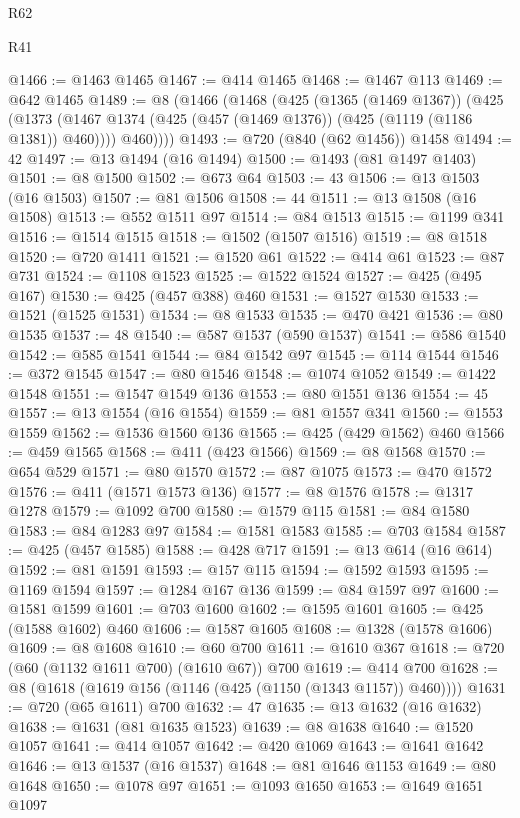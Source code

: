\begin{lexlean}{R62}
\begin{lexlean}{R41}
\begin{coremodule}
{{{{{{{{{{{{{{{{{{{{{{{{{{{{{{{{{{{{{{{{{{{{{{{{{{{{{{{{{{{{{{{{{{{{{{{{{{{{{{{{{{{{{{{@1466 := @1463 @1465
@1467 := @414 @1465
@1468 := @1467 @113
@1469 := @642 @1465
@1489 := @8
    (@1466
      (@1468
        (@425
          (@1365 (@1469 @1367))
          (@425
            (@1373 (@1467 @1374 (@425 (@457 (@1469 @1376)) (@425 (@1119 (@1186 @1381)) @460))))
            @460))))
@1493 := @720 (@840 (@62 @1456)) @1458
@1494 := 42
@1497 := @13 @1494 (@16 @1494)
@1500 := @1493 (@81 @1497 @1403)
@1501 := @8 @1500
@1502 := @673 @64
@1503 := 43
@1506 := @13 @1503 (@16 @1503)
@1507 := @81 @1506
@1508 := 44
@1511 := @13 @1508 (@16 @1508)
@1513 := @552 @1511 @97
@1514 := @84 @1513
@1515 := @1199 @341
@1516 := @1514 @1515
@1518 := @1502 (@1507 @1516)
@1519 := @8 @1518
@1520 := @720 @1411
@1521 := @1520 @61
@1522 := @414 @61
@1523 := @87 @731
@1524 := @1108 @1523
@1525 := @1522 @1524
@1527 := @425 (@495 @167)
@1530 := @425 (@457 @388) @460
@1531 := @1527 @1530
@1533 := @1521 (@1525 @1531)
@1534 := @8 @1533
@1535 := @470 @421
@1536 := @80 @1535
@1537 := 48
@1540 := @587 @1537 (@590 @1537)
@1541 := @586 @1540
@1542 := @585 @1541
@1544 := @84 @1542 @97
@1545 := @114 @1544
@1546 := @372 @1545
@1547 := @80 @1546
@1548 := @1074 @1052
@1549 := @1422 @1548
@1551 := @1547 @1549 @136
@1553 := @80 @1551 @136
@1554 := 45
@1557 := @13 @1554 (@16 @1554)
@1559 := @81 @1557 @341
@1560 := @1553 @1559
@1562 := @1536 @1560 @136
@1565 := @425 (@429 @1562) @460
@1566 := @459 @1565
@1568 := @411 (@423 @1566)
@1569 := @8 @1568
@1570 := @654 @529
@1571 := @80 @1570
@1572 := @87 @1075
@1573 := @470 @1572
@1576 := @411 (@1571 @1573 @136)
@1577 := @8 @1576
@1578 := @1317 @1278
@1579 := @1092 @700
@1580 := @1579 @115
@1581 := @84 @1580
@1583 := @84 @1283 @97
@1584 := @1581 @1583
@1585 := @703 @1584
@1587 := @425 (@457 @1585)
@1588 := @428 @717
@1591 := @13 @614 (@16 @614)
@1592 := @81 @1591
@1593 := @157 @115
@1594 := @1592 @1593
@1595 := @1169 @1594
@1597 := @1284 @167 @136
@1599 := @84 @1597 @97
@1600 := @1581 @1599
@1601 := @703 @1600
@1602 := @1595 @1601
@1605 := @425 (@1588 @1602) @460
@1606 := @1587 @1605
@1608 := @1328 (@1578 @1606)
@1609 := @8 @1608
@1610 := @60 @700
@1611 := @1610 @367
@1618 := @720 (@60 (@1132 @1611 @700) (@1610 @67)) @700
@1619 := @414 @700
@1628 := @8 (@1618 (@1619 @156 (@1146 (@425 (@1150 (@1343 @1157)) @460))))
@1631 := @720 (@65 @1611) @700
@1632 := 47
@1635 := @13 @1632 (@16 @1632)
@1638 := @1631 (@81 @1635 @1523)
@1639 := @8 @1638
@1640 := @1520 @1057
@1641 := @414 @1057
@1642 := @420 @1069
@1643 := @1641 @1642
@1646 := @13 @1537 (@16 @1537)
@1648 := @81 @1646 @1153
@1649 := @80 @1648
@1650 := @1078 @97
@1651 := @1093 @1650
@1653 := @1649 @1651 @1097
}}}}}}}}}}}}}}}}}}}}}}}}}}}}}}}}}}}}}}}}}}}}}}}}}}}}}}}}}}}}}}}}}}}}}}}}}}}}}}}}}}}}}}}
\end{coremodule}
\end{lexlean}
\end{lexlean}
